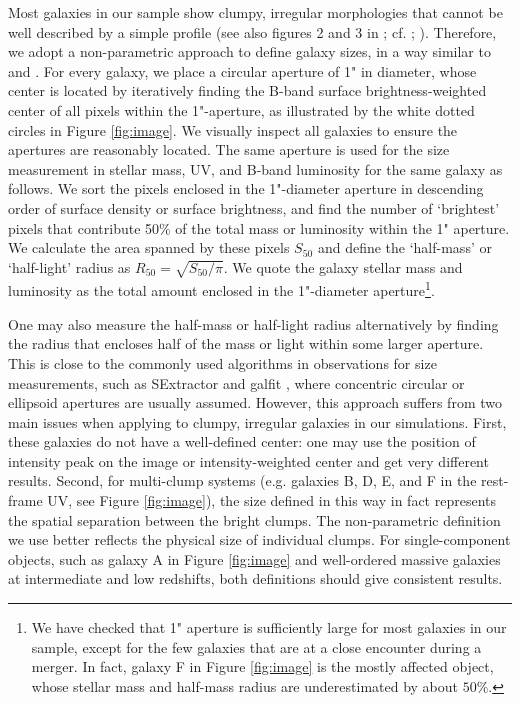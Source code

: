 \documentclass[useAMS,usenatbib]{mn2e}
\newcommand{\referee}[1]{{\color{black}#1}}
\begin{document}
Most galaxies in our sample show clumpy, irregular morphologies that cannot be well described by a simple profile (see also figures 2 and 3 in \citealt{ma.2017:fire.hiz.smf}; cf. \citealt{jiang.2013:uv.morphology.z6}; \citealt{bowler.2017:bright.z7.galaxies}). Therefore, we adopt a non-parametric approach to define galaxy sizes, in a way similar to \citet{curtis-lake.2016:size.evolution} and \citet{ribeiro.2016:galaxy.size.evolution}. For every galaxy, we place a circular aperture of 1" in diameter, whose center is located by iteratively finding the B-band surface brightness-weighted center of all pixels within the 1"-aperture, as illustrated by the white dotted circles in Figure \ref{fig:image}. We visually inspect all galaxies to ensure the apertures are reasonably located. The same aperture is used for the size measurement in stellar mass, UV, and B-band luminosity for the same galaxy as follows. We sort the pixels enclosed in the 1"-diameter aperture in descending order of surface density or surface brightness, and find the number of `brightest' pixels that contribute 50\% of the total mass or luminosity within the 1" aperture. We calculate the area spanned by these pixels $S_{50}$ and define the `half-mass' or `half-light' radius as $R_{50}=\sqrt{S_{50}/\pi}$. We quote the galaxy stellar mass and luminosity as the total amount enclosed in the 1"-diameter aperture\footnote{\referee{We have checked that 1" aperture is sufficiently large for most galaxies in our sample, except for the few galaxies that are at a close encounter during a merger. In fact, galaxy F in Figure \ref{fig:image} is the mostly affected object, whose stellar mass and half-mass radius are underestimated by about $50\%$.}}.

One may also measure the half-mass or half-light radius alternatively by finding the radius that encloses half of the mass or light within some larger aperture. This is close to the commonly used algorithms in observations for size measurements, such as {\sc SExtractor} and {\sc galfit} \citep[e.g.][]{oesch.2010:hudf.morphology}, where concentric circular or ellipsoid apertures are usually assumed. However, this approach suffers from two main issues when applying to clumpy, irregular galaxies in our simulations. First, these galaxies do not have a well-defined center: one may use the position of intensity peak on the image or intensity-weighted center and get very different results. Second, for multi-clump systems (e.g. galaxies B, D, E, and F in the rest-frame UV, see Figure \ref{fig:image}), the size defined in this way in fact represents the spatial separation between the bright clumps. The non-parametric definition we use better reflects the physical size of individual clumps. For single-component objects, such as galaxy A in Figure \ref{fig:image} and well-ordered massive galaxies at intermediate and low redshifts, both definitions should give consistent results.
\end{document}
